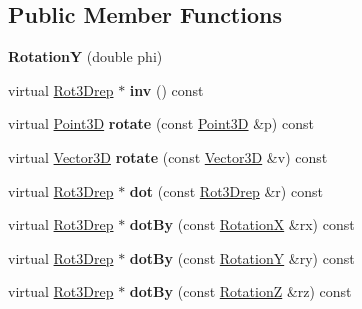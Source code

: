 \subsection*{Public Member Functions}
\begin{DoxyCompactItemize}
\item 
\mbox{\label{classRotationY_a1e82717aed9986081117c489817c9022}} 
{\bfseries RotationY} (double phi)
\item 
\mbox{\label{classRotationY_ac2be8663641ead3dc194b8fffb2b1e03}} 
virtual \hyperlink{classRot3Drep}{Rot3\+Drep} $\ast$ {\bfseries inv} () const
\item 
\mbox{\label{classRotationY_a6374c28902e48cac0ddee2c509f46be2}} 
virtual \hyperlink{classTVec3D}{Point3D} {\bfseries rotate} (const \hyperlink{classTVec3D}{Point3D} \&p) const
\item 
\mbox{\label{classRotationY_a4632bc9dc6998d99e40a30473fa1453e}} 
virtual \hyperlink{classTVec3D}{Vector3D} {\bfseries rotate} (const \hyperlink{classTVec3D}{Vector3D} \&v) const
\item 
\mbox{\label{classRotationY_a4c1ec99e01822ef63cb3e3ef93cbe5cd}} 
virtual \hyperlink{classRot3Drep}{Rot3\+Drep} $\ast$ {\bfseries dot} (const \hyperlink{classRot3Drep}{Rot3\+Drep} \&r) const
\item 
\mbox{\label{classRotationY_abd41904da3c55d728add69d9c23b1a6a}} 
virtual \hyperlink{classRot3Drep}{Rot3\+Drep} $\ast$ {\bfseries dot\+By} (const \hyperlink{classRotationX}{RotationX} \&rx) const
\item 
\mbox{\label{classRotationY_ac68cdf9032e93cf8c8624e4e1e1688b3}} 
virtual \hyperlink{classRot3Drep}{Rot3\+Drep} $\ast$ {\bfseries dot\+By} (const \hyperlink{classRotationY}{RotationY} \&ry) const
\item 
\mbox{\label{classRotationY_a9389d432e32026212736937ea5e7f590}} 
virtual \hyperlink{classRot3Drep}{Rot3\+Drep} $\ast$ {\bfseries dot\+By} (const \hyperlink{classRotationZ}{RotationZ} \&rz) const
\item 
\mbox{\label{classRotationY_a7d005b601392a3016fabc98b8ab938d9}} 

\end{DoxyCompactItemize}
